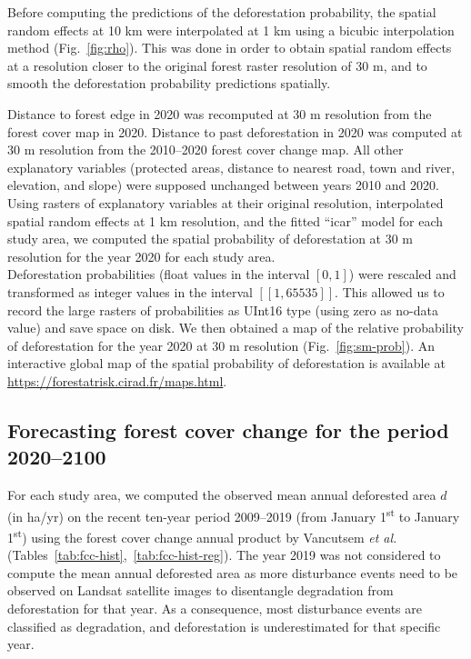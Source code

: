 \documentclass[
  12pt,
]{article}
\begin{document}
Before computing the predictions of the deforestation probability, the spatial random effects at 10 km were interpolated at 1 km using a bicubic interpolation method (Fig.~\ref{fig:rho}). This was done in order to obtain spatial random effects at a resolution closer to the original forest raster resolution of 30 m, and to smooth the deforestation probability predictions spatially.\enlargethispage{\baselineskip}

Distance to forest edge in 2020 was recomputed at 30 m resolution from the forest cover map in 2020. Distance to past deforestation in 2020 was computed at 30 m resolution from the 2010--2020 forest cover change map. All other explanatory variables (protected areas, distance to nearest road, town and river, elevation, and slope) were supposed unchanged between years 2010 and 2020. Using rasters of explanatory variables at their original resolution, interpolated spatial random effects at 1 km resolution, and the fitted ``icar'' model for each study area, we computed the spatial probability of deforestation at 30 m resolution for the year 2020 for each study area.\\

Deforestation probabilities (float values in the interval \([0, 1]\)) were rescaled and transformed as integer values in the interval \([\![1, 65535]\!]\). This allowed us to record the large rasters of probabilities as UInt16 type (using zero as no-data value) and save space on disk. We then obtained a map of the relative probability of deforestation for the year 2020 at 30 m resolution (Fig.~\ref{fig:sm-prob}). An interactive global map of the spatial probability of deforestation is available at \url{https://forestatrisk.cirad.fr/maps.html}.

\hypertarget{forecasting-forest-cover-change-for-the-period-20202100}{%
\subsection{Forecasting forest cover change for the period 2020--2100}\label{forecasting-forest-cover-change-for-the-period-20202100}}

For each study area, we computed the observed mean annual deforested area \(d\) (in ha/yr) on the recent ten-year period 2009--2019 (from January 1\textsuperscript{st} to January 1\textsuperscript{st}) using the forest cover change annual product by Vancutsem \emph{et al.} \citep{Vancutsem2021} (Tables~\ref{tab:fcc-hist},~\ref{tab:fcc-hist-reg}). The year 2019 was not considered to compute the mean annual deforested area as more disturbance events need to be observed on Landsat satellite images to disentangle degradation from deforestation for that year. As a consequence, most disturbance events are classified as degradation, and deforestation is underestimated for that specific year.\\
\end{document}
